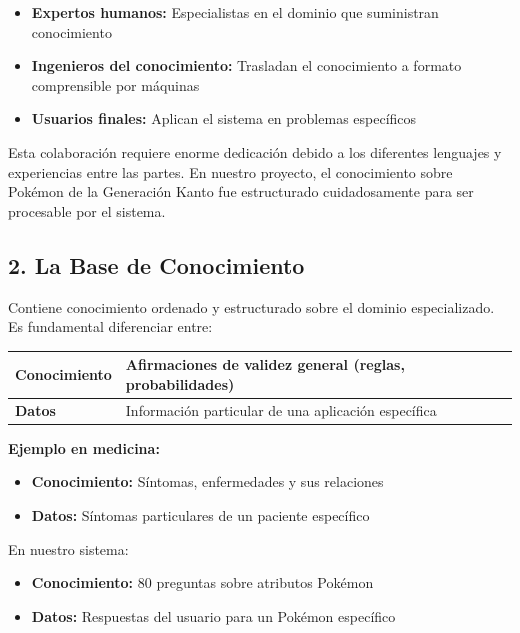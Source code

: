 \documentclass[12pt,a4paper]{article}
\begin{document}
\begin{itemize}
    \item \textbf{Expertos humanos:} Especialistas en el dominio que suministran conocimiento
    \item \textbf{Ingenieros del conocimiento:} Trasladan el conocimiento a formato comprensible por máquinas
    \item \textbf{Usuarios finales:} Aplican el sistema en problemas específicos
\end{itemize}

Esta colaboración requiere enorme dedicación debido a los diferentes lenguajes y experiencias entre las partes. En nuestro proyecto, el conocimiento sobre Pokémon de la Generación Kanto fue estructurado cuidadosamente para ser procesable por el sistema.

\subsection{2. La Base de Conocimiento}

Contiene conocimiento ordenado y estructurado sobre el dominio especializado. Es fundamental diferenciar entre:

\begin{center}
\begin{tabular}{|l|l|}
\hline
\textbf{Conocimiento} & Afirmaciones de validez general (reglas, probabilidades) \\
\hline
\textbf{Datos} & Información particular de una aplicación específica \\
\hline
\end{tabular}
\end{center}

\vspace{0.5cm}

\textbf{Ejemplo en medicina:}
\begin{itemize}
    \item \textbf{Conocimiento:} Síntomas, enfermedades y sus relaciones
    \item \textbf{Datos:} Síntomas particulares de un paciente específico
\end{itemize}

En nuestro sistema:
\begin{itemize}
    \item \textbf{Conocimiento:} 80 preguntas sobre atributos Pokémon
    \item \textbf{Datos:} Respuestas del usuario para un Pokémon específico
\end{itemize}
\end{document}
